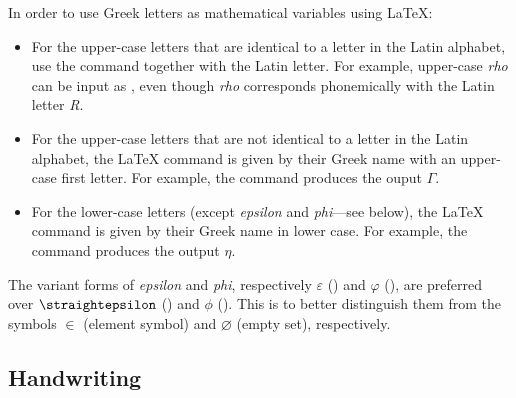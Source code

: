 \begin{latextip}
In order to use Greek letters as mathematical variables using \LaTeX{}:
\begin{itemize}
\item For the upper-case letters that are identical to a letter in the Latin alphabet, use the  command together with the Latin letter. For example, upper-case \textit{rho} can be input as , even though \textit{rho} corresponds phonemically with the Latin letter \textit{R}.
\item For the upper-case letters that are not identical to a letter in the Latin alphabet, the \LaTeX{} command is given by their Greek name with an upper-case first letter. For example, the command  produces the ouput $\Gamma$.
\item For the lower-case letters (except \textit{epsilon} and \textit{phi}---see below), the \LaTeX{} command is given by their Greek name in lower case. For example, the command  produces the output $\eta$.
\end{itemize}
The variant forms of \textit{epsilon} and \textit{phi}, respectively $\varepsilon$ () and $\varphi$ (), are preferred over $\text{\straightepsilon}$ () and $\phi$ (). This is to better distinguish them from the symbols $\in$ (element symbol) and $\varnothing$ (empty set), respectively.
\end{latextip}

\subsection*{Handwriting}

\todo{}